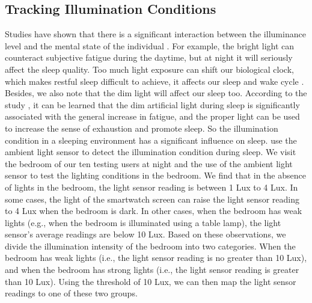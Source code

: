\subsection{Tracking Illumination Conditions \label{sec:illumination}}
Studies have shown that there is a significant interaction between the illuminance level and the mental state of the individual \cite{light77}. For example, the bright light can counteract subjective fatigue during the daytime, but at night it will seriously affect the sleep quality. Too much light exposure can shift our biological clock, which makes restful sleep difficult to achieve, it affects our sleep and wake cycle \cite{light2007}.  Besides, we also note that the dim light will affect our sleep too. According to the study \cite{light2016}, it can be learned that the dim artificial light during sleep is significantly associated with the general increase in fatigue, and the proper light can be used to increase the sense of exhaustion and promote sleep. So the illumination condition in a sleeping environment has a significant influence on sleep. {\systemname} use the ambient light sensor to detect the illumination condition during sleep. We visit the bedroom of our ten testing users at night and the use of the ambient light sensor to test the lighting conditions in the bedroom. We find that in the absence of lights in the bedroom, the light sensor reading is between 1 Lux to 4 Lux. In some cases, the light of the smartwatch screen can raise the light sensor reading to 4 Lux when the bedroom is dark. In other cases, when the bedroom has weak lights (e.g., when the bedroom is illuminated using a table lamp), the light sensor's average readings are below 10 Lux. Based on these observations, we divide the illumination intensity of the bedroom into two categories. When the bedroom has weak lights (i.e., the light sensor reading is no greater than 10 Lux), and when the bedroom has strong lights (i.e., the light sensor reading is greater than 10 Lux). Using the threshold of 10 Lux, we can then map the light sensor readings to one of these two groups.


